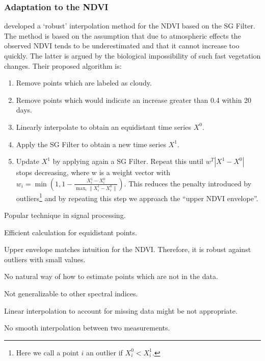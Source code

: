 		\subsubsection*{Adaptation to the NDVI}
			\cite{chenSimpleMethodReconstructing2004a} developed a `robust' interpolation method for the NDVI based on the SG Filter.
			The method is based on the assumption that due to atmospheric effects the observed NDVI tends to be underestimated and that it cannot increase too quickly. The latter is argued by the biological impossibility of such fast vegetation changes. Their proposed algorithm is:
			\begin{enumerate}
				\item Remove points which are labeled as cloudy.
				\item Remove points which would indicate an increase greater than 0.4 within 20 days.
				\item Linearly interpolate to obtain an equidistant time series $X^0$.
				\item Apply the SG Filter to obtain a new time series $X^1$.
				\item Update $X^1$ by applying again a SG Filter. Repeat this until $w^T |X^1-X^0|$ stops decreasing, where w is a weight vector with $w_i = \min\left(1, 1 - \frac{X^1_i-X^0_i}{\max_i\|X^1_i-X^0_i\|}\right)$. This reduces the penalty introduced by outliers\footnote{Here we call a point $i$ an outlier if $X^0_i<X^1_i$.} and by repeating this step we approach the ``upper NDVI envelope''.
			\end{enumerate}

		\begin{my_pros_cons_table}{
				\item Popular technique in signal processing.
				\item Efficient calculation for equidistant points.
				\item Upper envelope matches intuition for the NDVI. Therefore, it is robust against outliers with small values.
			}{
				\item No natural way of how to estimate points which are not in the data.
				\item Not generalizable to other spectral indices.
				\item Linear interpolation to account for missing data might be not appropriate.
				\item No smooth interpolation between two measurements.
			}
		\end{my_pros_cons_table}



